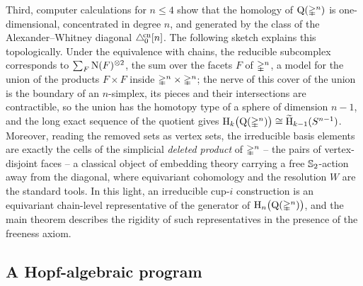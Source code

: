 \documentclass{amsart}
\begin{document}
Third, computer calculations for $n \leq 4$ show that the homology of $\mathrm{Q}(\mathbb{\Delta}^n)$ is one-dimensional, concentrated in degree $n$, and generated by the class of the Alexander--Whitney diagonal $\triangle^{\!\mathrm{cn}}_0[n]$.
The following sketch explains this topologically.
Under the equivalence with chains, the reducible subcomplex corresponds to $\sum_F \operatorname{N}(F)^{\otimes 2}$, the sum over the facets $F$ of $\mathbb{\Delta}^n$, a model for the union of the products $F \times F$ inside $\mathbb{\Delta}^n \times \mathbb{\Delta}^n$; the nerve of this cover of the union is the boundary of an $n$-simplex, its pieces and their intersections are contractible, so the union has the homotopy type of a sphere of dimension $n-1$, and the long exact sequence of the quotient gives $\mathrm{H}_k\big(\mathrm{Q}(\mathbb{\Delta}^n)\big) \cong \widetilde{\mathrm{H}}_{k-1}(S^{n-1})$.
Moreover, reading the removed sets as vertex sets, the irreducible basis elements are exactly the cells of the simplicial \emph{deleted product} of $\mathbb{\Delta}^n$ -- the pairs of vertex-disjoint faces -- a classical object of embedding theory carrying a free $\mathbb{S}_2$-action away from the diagonal, where equivariant cohomology and the resolution $W$ are the standard tools.
In this light, an irreducible \mbox{cup-$i$} construction is an equivariant chain-level representative of the generator of $\mathrm{H}_n\big(\mathrm{Q}(\mathbb{\Delta}^n)\big)$, and the main theorem describes the rigidity of such representatives in the presence of the freeness axiom.

\subsection*{A Hopf-algebraic program}
\end{document}
